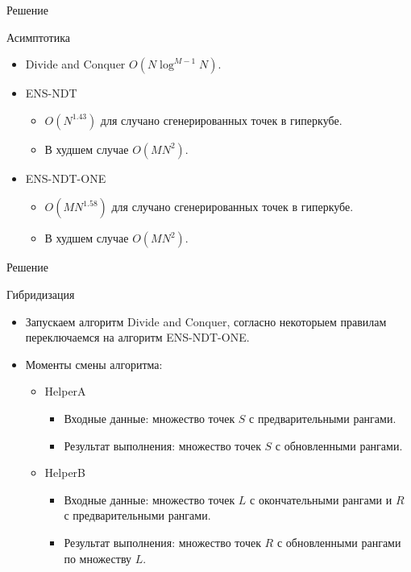 \documentclass[table]{beamer}
\begin{document}
\begin{frame}{Решение}
\begin{block}{Асимптотика}
\begin{itemize}
\item Divide and Conquer $O(N \log^{M-1}N)$.
\item ENS-NDT
\begin{itemize}
\item $O(N^{1.43})$ для случано сгенерированных точек в гиперкубе.
\item В худшем случае $O(MN^{2})$.
\end{itemize}
\item ENS-NDT-ONE
\begin{itemize}
\item $O(MN^{1.58})$ для случано сгенерированных точек в гиперкубе.
\item В худшем случае $O(MN^{2})$.
\end{itemize}
\end{itemize}
\end{block}
\end{frame}

\begin{frame}{Решение}
\begin{block}{Гибридизация}
  \begin{itemize}
  \item Запускаем алгоритм Divide and Conquer, согласно некоторыем правилам переключаемся на алгоритм ENS-NDT-ONE.
  \item Моменты смены алгоритма:
    \begin{itemize}
    \item HelperA
      \begin{itemize}
      \item Входные данные: множество точек $S$ с предварительными рангами.
      \item Результат выполнения: множество точек $S$ с обновленными рангами.
      \end{itemize}
    \item HelperB  
      \begin{itemize}
      \item Входные данные: множество точек $L$ с окончательными рангами и $R$ с предварительными рангами.
      \item Результат выполнения: множество точек $R$ с обновленными рангами по множеству $L$.
      \end{itemize}
    \end{itemize}
  \end{itemize}
\end{block}
\end{frame}
\end{document}
